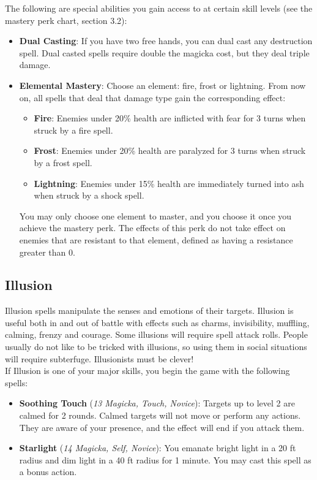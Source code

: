 The following are special abilities you gain access to at certain skill levels (see the mastery perk chart, section 3.2):

\begin{itemize}
\item \textbf{Dual Casting}: If you have two free hands, you can dual cast any destruction spell. Dual casted spells require double the magicka cost, but they deal triple damage.

\item \textbf{Elemental Mastery}: Choose an element: fire, frost or lightning. From now on, all spells that deal that damage type gain the corresponding effect:

\begin{itemize}
	\item \textbf{Fire}: Enemies under 20\% health are inflicted with fear for 3 turns when struck by a fire spell.
	\item \textbf{Frost}: Enemies under 20\% health are paralyzed for 3 turns when struck by a frost spell.
	\item \textbf{Lightning}: Enemies under 15\% health are immediately turned into ash when struck by a shock spell.
\end{itemize}

You may only choose one element to master, and you choose it once you achieve the mastery perk. The effects of this perk do not take effect on enemies that are resistant to that element, defined as having a resistance greater than 0.
\end{itemize}

\subsection{Illusion}
Illusion spells manipulate the senses and emotions of their targets. Illusion is useful both in and out of battle with effects such as charms, invisibility, muffling, calming, frenzy and courage. Some illusions will require spell attack rolls. People usually do not like to be tricked with illusions, so using them in social situations will require subterfuge. Illusionists must be clever!\\

If Illusion is one of your major skills, you begin the game with the following spells:
\begin{itemize}
	\item \textbf{Soothing Touch} (\textit{13 Magicka, Touch, Novice}): Targets up to level 2 are calmed for 2 rounds. Calmed targets will not move or perform any actions. They are aware of your presence, and the effect will end if you attack them.
	\item \textbf{Starlight} (\textit{14 Magicka, Self, Novice}): You emanate bright light in a 20 ft radius and dim light in a 40 ft radius for 1 minute. You may cast this spell as a bonus action.
\end{itemize}

